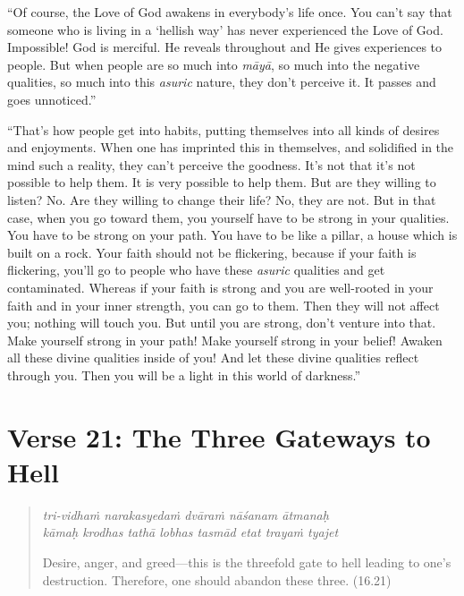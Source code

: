 \documentclass[12pt, twoside, openright]{memoir}
\begin{document}
\enquote{Of course, the Love of God awakens in everybody’s life once. You can’t say that someone who is living in a \enquote{hellish way} has never experienced the Love of God. Impossible! God is merciful. He reveals throughout and He gives experiences to people. But when people are so much into \textit{māyā}, so much into the negative qualities, so much into this \textit{asuric} nature, they don’t perceive it. It passes and goes unnoticed.}

\enquote{That’s how people get into habits, putting themselves into all kinds of desires and enjoyments. When one has imprinted this in themselves, and solidified in the mind such a reality, they can’t perceive the goodness. It’s not that it’s not possible to help them. It is very possible to help them. But are they willing to listen? No. Are they willing to change their life? No, they are not. But in that case, when you go toward them, you yourself have to be strong in your qualities. You have to be strong on your path. You have to be like a pillar, a house which is built on a rock. Your faith should not be flickering, because if your faith is flickering, you’ll go to people who have these \textit{asuric} qualities and get contaminated. Whereas if your faith is strong and you are well-rooted in your faith and in your inner strength, you can go to them. Then they will not affect you; nothing will touch you. But until you are strong, don’t venture into that. Make yourself strong in your path! Make yourself strong in your belief! Awaken all these divine qualities inside of you! And let these divine qualities reflect through you. Then you will be a light in this world of darkness.}

\section{Verse 21: The Three Gateways to Hell}\label{sec-verse-21-the-three-gateways-to-hell}


\par
\begin{verse}
\textit{tri-vidhaṁ narakasyedaṁ dvāraṁ nāśanam ātmanaḥ} \\
\textit{kāmaḥ krodhas tathā lobhas tasmād etat trayaṁ tyajet}

\noindent Desire, anger, and greed---this is the threefold gate to hell leading to one's destruction. Therefore, one should abandon these three. (16.21)
\end{verse}
\par
\end{document}
